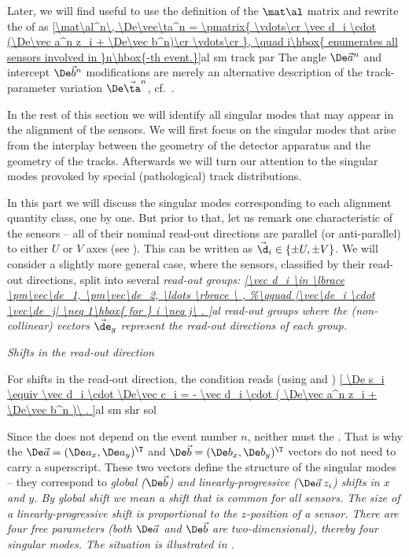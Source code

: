 Later, we will find useful to use the definition of the $\mat\al$ matrix  and rewrite the \rhs{} of  as
\eqref{\mat\al^n\, \De\vec\ta^n = \pmatrix{
	\vdots\cr
	\vec d_i \cdot (\De\vec a^n z_i + \De\vec b^n)\cr
	\vdots\cr
}, \quad i\hbox{ enumerates all sensors involved in }n\hbox{-th event.}}{al sm track par}
The angle $\De\vec a^n$ and intercept $\De\vec b^n$ modifications are merely an alternative description of the track-parameter variation $\De\vec\ta^n$, cf.~.

In the rest of this section we will identify all singular modes that may appear in the alignment of the  sensors. We will first focus on the singular modes that arise from the interplay between the geometry of the detector apparatus and the geometry of the tracks. Afterwards we will turn our attention to the singular modes provoked by special (pathological) track distributions.


In this part we will discuss the singular modes corresponding to each alignment quantity class, one by one. But prior to that, let us remark one characteristic of the  sensors -- all of their nominal read-out directions are parallel (or anti-parallel) to either $U$ or $V$ axes (see ). This can be written as $\vec\d_i \in \{\pm U, \pm V\}$. We will consider a slightly more general case, where the sensors, classified by their read-out directions, split into several \em{read-out groups}:
\eqref{\vec d_i \in \lbrace \pm\vec\de_1, \pm\vec\de_2, \ldots \rbrace \ ,
}{al read-out groups}
where the (non-collinear) vectors $\vec\de_g$ represent the read-out directions of each group. 

\baselineskip
\indent\em{Shifts in the read-out direction}

For shifts in the read-out direction, the condition  reads (using  and )
\eqref{
	\De s_i \equiv
	\vec d_i \cdot \De\vec c_i =
	- \vec d_i \cdot ( \De\vec a^n z_i + \De\vec b^n )\ .
}{al sm shr sol}

Since the \lhs{} does not depend on the event number $n$, neither must the \rhs{}. That is why the ${\De\vec a}=(\De a_x, \De a_y)^\T$ and ${\De\vec b=(\De b_x, \De b_y)^\T}$ vectors do not need to carry a superscript. These two vectors define the structure of the singular modes -- they correspond to \em{global} ($\De\vec b$) and \em{linearly-progressive} ($\De\vec a\, z_i$) shifts in $x$ and $y$. By global shift we mean a shift that is common for all sensors. The size of a linearly-progressive shift is proportional to the $z$-position of a sensor. There are four free parameters (both $\De\vec a$ and $\De\vec b$ are two-dimensional), thereby four singular modes. The situation is illustrated in .

